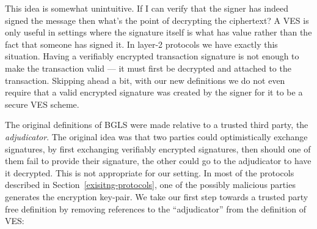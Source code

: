 \documentclass[fullpage]{article}
\theoremstyle{definition}
\begin{document}
This idea is somewhat unintuitive. If I can verify that the signer has indeed signed the message then what's the point of decrypting the ciphertext? A VES is only useful in settings where the signature itself is what has value rather than the fact that someone has signed it. In layer-2 protocols we have exactly this situation. Having a verifiably encrypted transaction signature is not enough to make the transaction valid --- it must first be decrypted and attached to the transaction. Skipping ahead a bit, with our new definitions we do not even require that a valid encrypted signature was created by the signer for it to be a secure VES scheme.

The original definitions of BGLS were made relative to a trusted third party, the \emph{adjudicator}. The original idea was that two parties could optimistically exchange signatures, by first exchanging verifiably encrypted signatures, then should one of them fail to provide their signature, the other could go to the adjudicator to have it decrypted. This is not appropriate for our setting. In most of the protocols described in Section~\ref{exisitng-protocols}, one of the possibly malicious parties generates the encryption key-pair. We take our first step towards a trusted party free definition by removing references to the ``adjudicator'' from the definition of VES:

\newcommand{\rightsample}{\hskip2.3pt{\mbox{\tiny${\$}$\normalsize}}\!\!\rightarrow\,}
\end{document}
